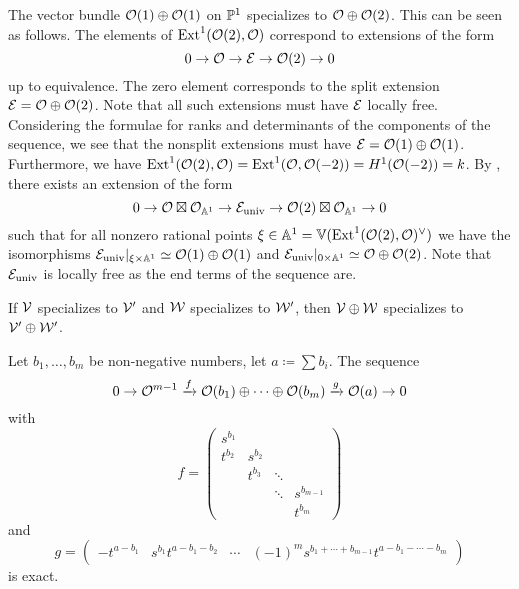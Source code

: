 \begin{example}
	The vector bundle $\mathcal{O}(1)\oplus \mathcal{O}(1)$ on $\mathbb{P}^1$ specializes to $\mathcal{O}\oplus \mathcal{O}(2)$.
	This can be seen as follows.
	The elements of $\operatorname{Ext}^1(\mathcal{O}(2),\mathcal{O})$ correspond to extensions of the form
	\[ 0 \to \mathcal{O} \to \mathcal{E} \to \mathcal{O}(2) \to 0\]
	up to equivalence. The zero element corresponds to the split extension $\mathcal{E} = \mathcal{O} \oplus \mathcal{O}(2)$.
	Note that all such extensions must have $\mathcal{E}$ locally free.
	Considering the formulae for ranks and determinants of the components of the sequence, we see that the nonsplit extensions must have $\mathcal{E}=\mathcal{O}(1)\oplus\mathcal{O}(1)$.
	Furthermore, we have $\operatorname{Ext}^1(\mathcal{O}(2),\mathcal{O}) = \operatorname{Ext}^1(\mathcal{O},\mathcal{O}(-2))=H^1(\mathcal{O}(-2))=k$.
	By , there exists an extension of the form
	\[0 \to \mathcal{O}\boxtimes \mathcal{O}_{\mathbb{A}^1} \to \mathcal{E}_{\text{univ}} \to \mathcal{O}(2)\boxtimes \mathcal{O}_{\mathbb{A}^1} \to 0\]
	such that for all nonzero rational points $\xi\in\mathbb{A}^1 = \mathbb{V}(\operatorname{Ext}^1(\mathcal{O}(2),\mathcal{O})^\vee)$ we have the isomorphisms $\mathcal{E}_{\text{univ}}|_{\xi \times \mathbb{A}^1} \simeq \mathcal{O}(1)\oplus\mathcal{O}(1)$ and $\mathcal{E}_{\text{univ}}|_{0\times \mathbb{A}^1} \simeq \mathcal{O} \oplus \mathcal{O}(2)$. Note that $\mathcal{E}_{\text{univ}}$ is locally free as the end terms of the sequence are.
\end{example}

\begin{remark} \label{rem:specialization-sum}
	If $\mathcal{V}$ specializes to $\mathcal{V}'$ and $\mathcal{W}$ specializes to $\mathcal{W}'$, then $\mathcal{V}\oplus\mathcal{W}$ specializes to $\mathcal{V}'\oplus\mathcal{W}'$.
\end{remark}

\begin{remark} \label{rem:exact-sequence-exists}
	Let $b_1,\dotsc,b_m$ be non-negative numbers, let $a\coloneqq \sum b_i$. The sequence
	\[ 0 \to \mathcal{O}^{m-1} \xrightarrow{f} \mathcal{O}(b_1)\oplus \dotsb \oplus \mathcal{O}(b_m) \xrightarrow{g} \mathcal{O}(a) \to 0 \]
	with \[
	f = \begin{pmatrix}
	s^{b_1}&        &	   &           \\
	t^{b_2}& s^{b_2}&      &           \\
	       & t^{b_3}&\ddots&           \\
	       &        &\ddots&s^{b_{m-1}}\\
	       &        &      &t^{b_m}
	\end{pmatrix} 
	\]
	and
	\[
	g = \begin{pmatrix}
	-t^{a-b_1} & s^{b_1}t^{a-b_1-b_2} & \cdots & (-1)^{m} s^{b_1 + \dotsb + b_{m-1}}t^{a-b_1-\dotsb-b_m}
	\end{pmatrix}
	\]
	is exact.
\end{remark}

